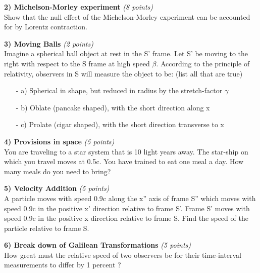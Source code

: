 {\large
\textbf{2) Michelson-Morley experiment } \hfill \textit{(8 points)}\\
Show that the null effect of the Michelson-Morley experiment can be accounted for by Lorentz contraction.

\vspace*{0.25in}


\textbf{3) Moving Balls } \hfill \textit{(2 points)}\\
Imagine  a spherical ball  object at rest in the S' frame.
Let S' be moving to the right with respect to the S frame at high speed $\beta$.
According to the principle of relativity, observers in S will measure the object to be: (list all that are true) 

\begin{itemize}
\item[-] a) Spherical in shape, but reduced in radius by the stretch-factor $\gamma$
\item[-] b) Oblate (pancake shaped), with the short direction along x
\item[-] c) Prolate (cigar shaped), with the short direction transverse to x 
\end{itemize}

\vspace*{0.25in}

\textbf{4) Provisions in space  } \hfill \textit{(5 points)}\\
You are traveling to a star system that is 10 light years away.
The star-ship on which you travel moves at 0.5c.
You have trained to eat one meal a day.
How many meals do you need to bring?

\vspace*{0.25in}


\textbf{5) Velocity Addition  } \hfill \textit{(5 points)}\\
A particle moves with speed 0.9c along the x'' axis of frame S'' which moves with speed 0.9c in the positive x' direction relative to frame S'.
Frame S' moves with speed 0.9c in the positive x direction relative to frame S. Find the speed of the particle relative to frame S.

\vspace*{0.25in}

\textbf{6) Break down of Galilean Transformations   } \hfill \textit{(5 points)}\\
How great must the relative speed of two observers be for their time-interval measurements to differ by 1 percent ?

\clearpage

}
